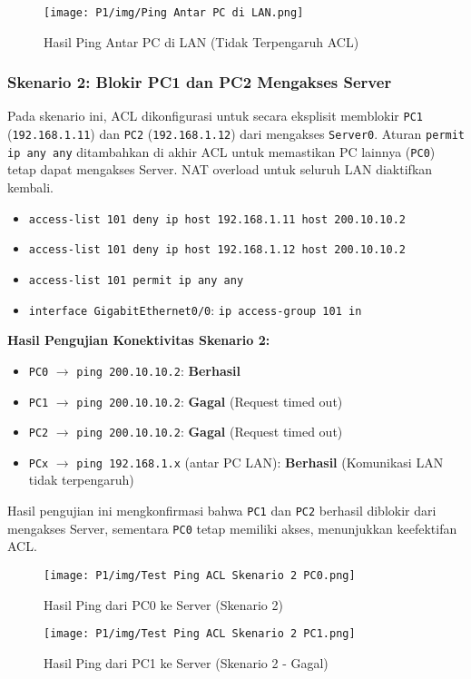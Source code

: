 \begin{figure}[H]
    \centering
    \texttt{[image: P1/img/Ping Antar PC di LAN.png]}
    \caption{Hasil Ping Antar PC di LAN (Tidak Terpengaruh ACL)}
    \label{fig:ping_lan}
\end{figure}

\subsubsection*{Skenario 2: Blokir PC1 dan PC2 Mengakses Server}
Pada skenario ini, ACL dikonfigurasi untuk secara eksplisit memblokir \texttt{PC1} (\texttt{192.168.1.11}) dan \texttt{PC2} (\texttt{192.168.1.12}) dari mengakses \texttt{Server0}. Aturan \texttt{permit ip any any} ditambahkan di akhir ACL untuk memastikan PC lainnya (\texttt{PC0}) tetap dapat mengakses Server. NAT overload untuk seluruh LAN diaktifkan kembali.

\begin{itemize}
    \item \texttt{access-list 101 deny ip host 192.168.1.11 host 200.10.10.2}
    \item \texttt{access-list 101 deny ip host 192.168.1.12 host 200.10.10.2}
    \item \texttt{access-list 101 permit ip any any}
    \item \texttt{interface GigabitEthernet0/0}: \texttt{ip access-group 101 in}
\end{itemize}

\textbf{Hasil Pengujian Konektivitas Skenario 2:}
\begin{itemize}
    \item \texttt{PC0} $\rightarrow$ \texttt{ping 200.10.10.2}: \textbf{Berhasil}
    \item \texttt{PC1} $\rightarrow$ \texttt{ping 200.10.10.2}: \textbf{Gagal} (Request timed out)
    \item \texttt{PC2} $\rightarrow$ \texttt{ping 200.10.10.2}: \textbf{Gagal} (Request timed out)
    \item \texttt{PCx} $\rightarrow$ \texttt{ping 192.168.1.x} (antar PC LAN): \textbf{Berhasil} (Komunikasi LAN tidak terpengaruh)
\end{itemize}
Hasil pengujian ini mengkonfirmasi bahwa \texttt{PC1} dan \texttt{PC2} berhasil diblokir dari mengakses Server, sementara \texttt{PC0} tetap memiliki akses, menunjukkan keefektifan ACL.

\begin{figure}[H]
    \centering
    \begin{minipage}[t]{0.48\textwidth}
        \centering  
        \texttt{[image: P1/img/Test Ping ACL Skenario 2 PC0.png]}
        \caption{Hasil Ping dari PC0 ke Server (Skenario 2)}
        \label{fig:ping_acl2_pc0}
    \end{minipage}
    \hfill
    \begin{minipage}[t]{0.48\textwidth}
        \centering
        \texttt{[image: P1/img/Test Ping ACL Skenario 2 PC1.png]}
        \caption{Hasil Ping dari PC1 ke Server (Skenario 2 - Gagal)}
        \label{fig:ping_acl2_pc1}
    \end{minipage}
\end{figure}

